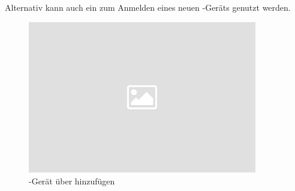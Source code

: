 \noindent
Alternativ kann auch ein \qr zum Anmelden eines neuen \cli-Geräts genutzt werden.

\noindent
\begin{figure}[ht]
	\centering
  \includegraphics[width=10cm]{pictures/placeholder.png}
	\caption{\cli-Gerät über \qr hinzufügen}
	\label{pic/cli_add_qr}
\end{figure}

